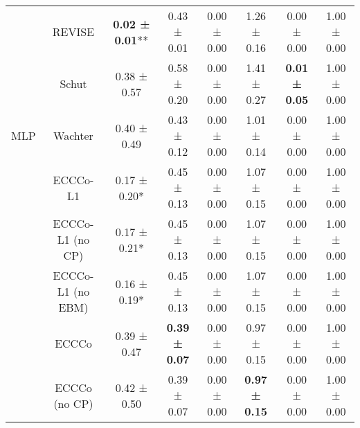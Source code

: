 \begin{table}
{\begin{tabular}[t]{cccccccc}
 & REVISE & \textbf{0.02 ± 0.01}** & 0.43 ± 0.01\hphantom{*}\hphantom{*} & 0.00 ± 0.00\hphantom{*}\hphantom{*} & 1.26 ± 0.16\hphantom{*}\hphantom{*} & 0.00 ± 0.00\hphantom{*}\hphantom{*} & 1.00 ± 0.00\hphantom{*}\hphantom{*}\\

 & Schut & 0.38 ± 0.57\hphantom{*}\hphantom{*} & 0.58 ± 0.20\hphantom{*}\hphantom{*} & 0.00 ± 0.00\hphantom{*}\hphantom{*} & 1.41 ± 0.27\hphantom{*}\hphantom{*} & \textbf{0.01 ± 0.05}\hphantom{*}\hphantom{*} & 1.00 ± 0.00\hphantom{*}\hphantom{*}\\

\multirow[t]{-9}{*}{\centering\arraybackslash MLP} & Wachter & 0.40 ± 0.49\hphantom{*}\hphantom{*} & 0.43 ± 0.12\hphantom{*}\hphantom{*} & 0.00 ± 0.00\hphantom{*}\hphantom{*} & 1.01 ± 0.14\hphantom{*}\hphantom{*} & 0.00 ± 0.00\hphantom{*}\hphantom{*} & 1.00 ± 0.00\hphantom{*}\hphantom{*}\\
\cmidrule{1-8}
 & ECCCo-L1 & 0.17 ± 0.20*\hphantom{*} & 0.45 ± 0.13\hphantom{*}\hphantom{*} & 0.00 ± 0.00\hphantom{*}\hphantom{*} & 1.07 ± 0.15\hphantom{*}\hphantom{*} & 0.00 ± 0.00\hphantom{*}\hphantom{*} & 1.00 ± 0.00\hphantom{*}\hphantom{*}\\

 & ECCCo-L1 (no CP) & 0.17 ± 0.21*\hphantom{*} & 0.45 ± 0.13\hphantom{*}\hphantom{*} & 0.00 ± 0.00\hphantom{*}\hphantom{*} & 1.07 ± 0.15\hphantom{*}\hphantom{*} & 0.00 ± 0.00\hphantom{*}\hphantom{*} & 1.00 ± 0.00\hphantom{*}\hphantom{*}\\

 & ECCCo-L1 (no EBM) & 0.16 ± 0.19*\hphantom{*} & 0.45 ± 0.13\hphantom{*}\hphantom{*} & 0.00 ± 0.00\hphantom{*}\hphantom{*} & 1.07 ± 0.15\hphantom{*}\hphantom{*} & 0.00 ± 0.00\hphantom{*}\hphantom{*} & 1.00 ± 0.00\hphantom{*}\hphantom{*}\\

 & ECCCo & 0.39 ± 0.47\hphantom{*}\hphantom{*} & \textbf{0.39 ± 0.07}\hphantom{*}\hphantom{*} & 0.00 ± 0.00\hphantom{*}\hphantom{*} & 0.97 ± 0.15\hphantom{*}\hphantom{*} & 0.00 ± 0.00\hphantom{*}\hphantom{*} & 1.00 ± 0.00\hphantom{*}\hphantom{*}\\

 & ECCCo (no CP) & 0.42 ± 0.50\hphantom{*}\hphantom{*} & 0.39 ± 0.07\hphantom{*}\hphantom{*} & 0.00 ± 0.00\hphantom{*}\hphantom{*} & \textbf{0.97 ± 0.15}\hphantom{*}\hphantom{*} & 0.00 ± 0.00\hphantom{*}\hphantom{*} & 1.00 ± 0.00\hphantom{*}\hphantom{*}\\


\end{tabular}}
\end{table}
